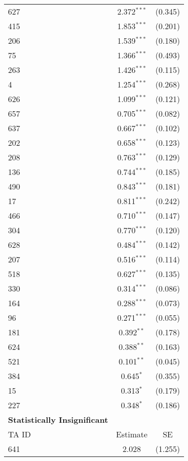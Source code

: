 \begin{center}
\begin{longtable}{lcc}
    627 & 2.372$^{\ast\ast\ast}$ & (0.345) \\
    415 & 1.853$^{\ast\ast\ast}$ & (0.201) \\
    206 & 1.539$^{\ast\ast\ast}$ & (0.180) \\
    75  & 1.366$^{\ast\ast\ast}$ & (0.493) \\
    263 & 1.426$^{\ast\ast\ast}$ & (0.115) \\
    4   & 1.254$^{\ast\ast\ast}$ & (0.268) \\
    626 & 1.099$^{\ast\ast\ast}$ & (0.121) \\
    657 & 0.705$^{\ast\ast\ast}$ & (0.082) \\
    637 & 0.667$^{\ast\ast\ast}$ & (0.102) \\
    202 & 0.658$^{\ast\ast\ast}$ & (0.123) \\
    208 & 0.763$^{\ast\ast\ast}$ & (0.129) \\
    136 & 0.744$^{\ast\ast\ast}$ & (0.185) \\
    490 & 0.843$^{\ast\ast\ast}$ & (0.181) \\
    17  & 0.811$^{\ast\ast\ast}$ & (0.242) \\
    466 & 0.710$^{\ast\ast\ast}$ & (0.147) \\
    304 & 0.770$^{\ast\ast\ast}$ & (0.120) \\
    628 & 0.484$^{\ast\ast\ast}$ & (0.142) \\
    207 & 0.516$^{\ast\ast\ast}$ & (0.114) \\
    518 & 0.627$^{\ast\ast\ast}$ & (0.135) \\
    330 & 0.314$^{\ast\ast\ast}$ & (0.086) \\
    164 & 0.288$^{\ast\ast\ast}$ & (0.073) \\
    96 & 0.271$^{\ast\ast\ast}$ & (0.055) \\
    181 & 0.392$^{\ast\ast}$ & (0.178) \\
    624 & 0.388$^{\ast\ast}$ & (0.163) \\
    521 & 0.101$^{\ast\ast}$ & (0.045) \\
    384  & 0.645$^{\ast}$ & (0.355) \\
    15  & 0.313$^{\ast}$ & (0.179) \\
    227 & 0.348$^{\ast}$ & (0.186) \\
    \hline
    \textbf{Statistically Insignificant} &  &  \\
    \hline
    TA ID & Estimate & SE \\
    \hline
    641 & 2.028 & (1.255) \\

\end{longtable}
\end{center}
